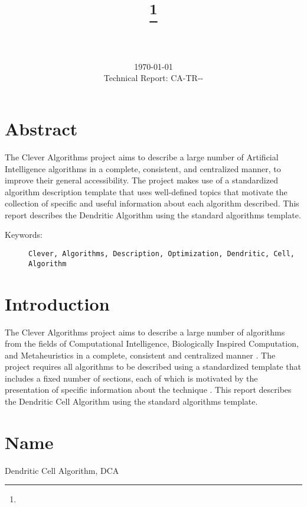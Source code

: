 \documentclass[a4paper, 11pt]{article}
\title{{\myreporttitle}\footnote{\myreportlicense}}
\author{\myreportauthor\\{\myreportemail}\\\small\myreportproject}
\date{\today\\{\small{Technical Report: CA-TR-{\myreportdate}-\myreportversion}}}
\begin{document}
\maketitle

\section*{Abstract} 
The Clever Algorithms project aims to describe a large number of Artificial Intelligence algorithms in a complete, consistent, and centralized manner, to improve their general accessibility. 
The project makes use of a standardized algorithm description template that uses well-defined topics that motivate the collection of specific and useful information about each algorithm described.
This report describes the Dendritic Algorithm using the standard algorithms template.

\begin{description}
	\item[Keywords:] {\small\texttt{Clever, Algorithms, Description, Optimization, Dendritic, Cell, Algorithm}}
\end{description} 

\section{Introduction} 
\label{sec:intro}
The Clever Algorithms project aims to describe a large number of algorithms from the fields of Computational Intelligence, Biologically Inspired Computation, and Metaheuristics in a complete, consistent and centralized manner \cite{Brownlee2010}.
The project requires all algorithms to be described using a standardized template that includes a fixed number of sections, each of which is motivated by the presentation of specific information about the technique \cite{Brownlee2010a}.
This report describes the Dendritic Cell Algorithm using the standard algorithms template.

\section{Name} 
\label{sec:name}
Dendritic Cell Algorithm, DCA
\end{document}

